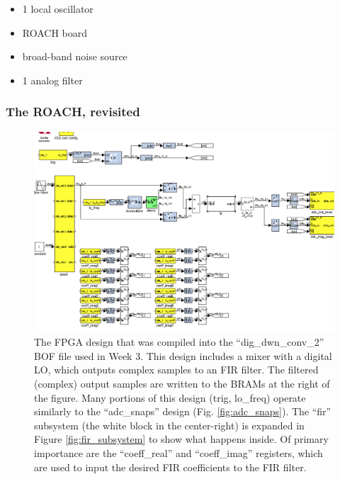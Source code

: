 \documentclass[11pt]{article}
\begin{document}
\begin{itemize}[noitemsep,nolistsep]
\item 1 local oscillator
\item ROACH board
\item broad-band noise source
\item 1 analog filter
\end{itemize}

\subsubsection*{The ROACH, revisited}

\begin{figure}\centering
\includegraphics[width=6in]{plots/ddc_overview.png}
\caption{
The FPGA design that was compiled into the 
``dig\_dwn\_conv\_2'' BOF file used in Week 3.  This design includes a mixer with a digital
LO, which outputs complex samples to an FIR filter.  The filtered (complex) output samples
are written to the BRAMs at the right of the figure.
Many portions of this design
(trig, lo\_freq) operate similarly to the ``adc\_snaps'' design (Fig. \ref{fig:adc_snaps}).
The ``fir'' subsystem (the white block in the center-right) is expanded in
Figure \ref{fig:fir_subsystem} to show what happens inside.  Of primary importance
are the ``coeff\_real'' and ``coeff\_imag'' registers, which are used to input the desired
FIR coefficients to the FIR filter.
} \label{fig:ddc_overview}
\end{figure}
\end{document}

